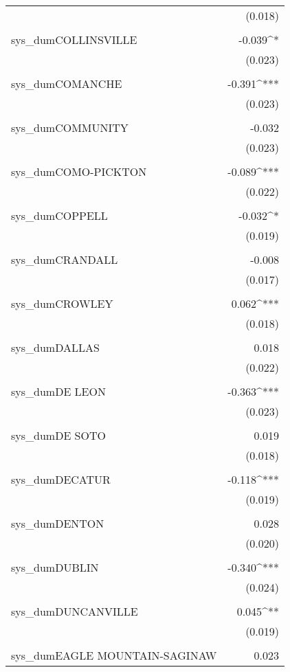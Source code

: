 \begin{table}[!htbp]
\begin{tabular}{@{\extracolsep{5pt}}lD{.}{.}{-3} }
  & (0.018) \\ 
  & \\ 
 sys\_dumCOLLINSVILLE & -0.039^{*} \\ 
  & (0.023) \\ 
  & \\ 
 sys\_dumCOMANCHE & -0.391^{***} \\ 
  & (0.023) \\ 
  & \\ 
 sys\_dumCOMMUNITY & -0.032 \\ 
  & (0.023) \\ 
  & \\ 
 sys\_dumCOMO-PICKTON & -0.089^{***} \\ 
  & (0.022) \\ 
  & \\ 
 sys\_dumCOPPELL & -0.032^{*} \\ 
  & (0.019) \\ 
  & \\ 
 sys\_dumCRANDALL & -0.008 \\ 
  & (0.017) \\ 
  & \\ 
 sys\_dumCROWLEY & 0.062^{***} \\ 
  & (0.018) \\ 
  & \\ 
 sys\_dumDALLAS & 0.018 \\ 
  & (0.022) \\ 
  & \\ 
 sys\_dumDE LEON & -0.363^{***} \\ 
  & (0.023) \\ 
  & \\ 
 sys\_dumDE SOTO & 0.019 \\ 
  & (0.018) \\ 
  & \\ 
 sys\_dumDECATUR & -0.118^{***} \\ 
  & (0.019) \\ 
  & \\ 
 sys\_dumDENTON & 0.028 \\ 
  & (0.020) \\ 
  & \\ 
 sys\_dumDUBLIN & -0.340^{***} \\ 
  & (0.024) \\ 
  & \\ 
 sys\_dumDUNCANVILLE & 0.045^{**} \\ 
  & (0.019) \\ 
  & \\ 
 sys\_dumEAGLE MOUNTAIN-SAGINAW & 0.023 \\ 

\end{tabular}
\end{table}
